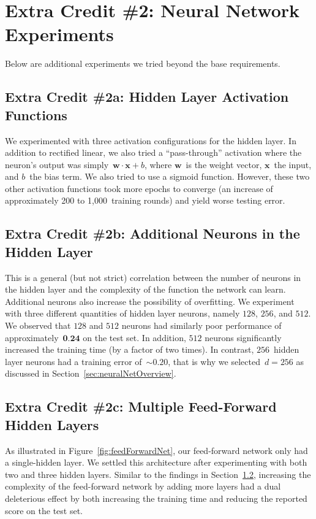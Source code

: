 \documentclass{report}
\begin{document}
  \section{Extra Credit \#2: Neural Network Experiments}\label{sec:extraNnExperiments}
  
  Below are additional experiments we tried beyond the base requirements.  
  
  \subsection{Extra Credit \#2a: Hidden Layer Activation Functions}
  
  We experimented with three activation configurations for the hidden layer.  In addition to rectified linear, we also tried a ``pass-through'' activation where the neuron's output was simply~$\textbf{w}\cdot\textbf{x} + b$, where $\textbf{w}$~is the weight vector, $\textbf{x}$~the input, and $b$~the bias term.  We also tried to use a sigmoid function.  However, these two other activation functions took more epochs to converge (an increase of approximately 200 to 1,000~training rounds) and yield worse testing error.
  
  \subsection{Extra Credit \#2b: Additional Neurons in the Hidden Layer}\label{sec:ecMoreHiddenLayerNeurons}
  
  This is a general (but not strict) correlation between the number of neurons in the hidden layer and the complexity of the function the network can learn.  Additional neurons also increase the possibility of overfitting.  We experiment with three different quantities of hidden layer neurons, namely $128$, $256$, and $512$.  We observed that $128$ and $512$ neurons had similarly poor performance of approximately~$\textbf{0.24}$ on the test set.  In addition, $512$ neurons significantly increased the training time (by a factor of two times).  In contrast, $256$~hidden layer neurons had a training error of~$\sim0.20$, that is why we selected~$d=256$ as discussed in Section~\ref{sec:neuralNetOverview}.
     
  \subsection{Extra Credit \#2c: Multiple Feed-Forward Hidden Layers}
  
  As illustrated in Figure~\ref{fig:feedForwardNet}, our feed-forward network only had a single-hidden layer.  We settled this architecture after experimenting with both two and three hidden layers.  Similar to the findings in Section~\ref{sec:ecMoreHiddenLayerNeurons}, increasing the complexity of the feed-forward network by adding more layers had a dual deleterious effect by both increasing the training time and reducing the reported score on the test set.
     
\end{document}
